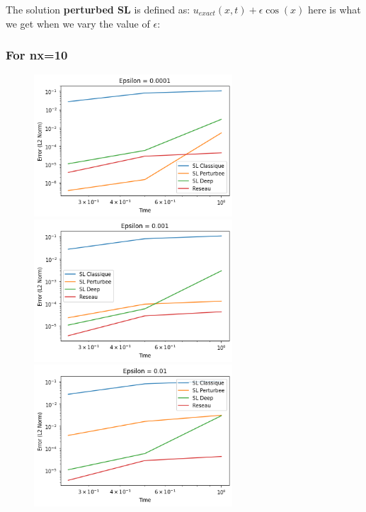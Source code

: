 \documentclass{article}
\begin{document}
The solution \textbf{perturbed SL} is defined as: $u_{exact}(x,t) + \epsilon \cos(x)$ here is what we get when we vary the value of $\epsilon$:\\

\subsubsection*{For nx=10}

\begin{figure}[!h]
    \centering
    \includegraphics[width=0.66\textwidth]{images/10ep11.png}
    \includegraphics[width=0.66\textwidth]{images/10ep12.png}
    \includegraphics[width=0.66\textwidth]{images/10ep13.png}
\end{figure}
\end{document}
